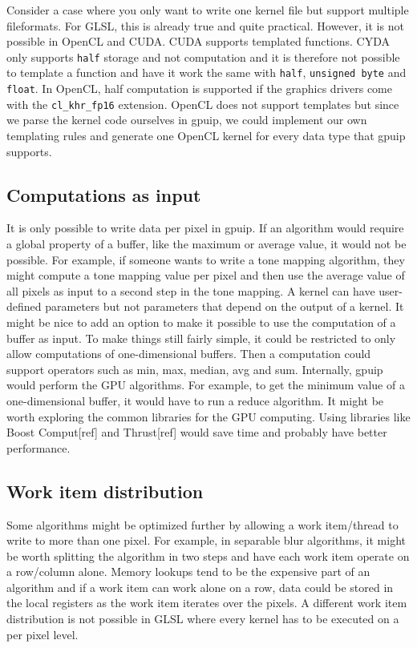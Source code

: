 Consider a case where you only want to write one kernel file but support multiple fileformats. For GLSL, this is already true and quite practical. However, it is not possible in OpenCL and CUDA. CUDA supports templated functions. CYDA only supports {\tt half} storage and not computation and it is therefore not possible to template a function and have it work the same with {\tt half}, {\tt unsigned byte} and {\tt float}. In OpenCL, half computation is supported if the graphics drivers come with the {\tt cl\_khr\_fp16} extension. OpenCL does not support templates but since we parse the kernel code ourselves in gpuip, we could implement our own templating rules and generate one OpenCL kernel for every data type that gpuip supports. 

\subsection{Computations as input}

It is only possible to write data per pixel in gpuip. If an algorithm would require a global property of a buffer, like the maximum or average value, it would not be possible. For example, if someone wants to write a tone mapping algorithm, they might compute a tone mapping value per pixel and then use the average value of all pixels as input to a second step in the tone mapping. A kernel can have user-defined parameters but not parameters that depend on the output of a kernel. It might be nice to add an option to make it possible to use the computation of a buffer as input. To make things still fairly simple, it could be restricted to only allow computations of one-dimensional buffers. Then a computation could support operators such as min, max, median, avg and sum. Internally, gpuip would perform the GPU algorithms. For example, to get the minimum value of a one-dimensional buffer, it would have to run a reduce algorithm. It might be worth exploring the common libraries for the GPU computing. Using libraries like Boost Comput[ref] and Thrust[ref] would save time and probably have better performance.

\subsection{Work item distribution}

Some algorithms might be optimized further by allowing a work item/thread to write to more than one pixel. For example, in separable blur algorithms, it might be worth splitting the algorithm in two steps and have each work item operate on a row/column alone. Memory lookups tend to be the expensive part of an algorithm and if a work item can work alone on a row, data could be stored in the local registers as the work item iterates over the pixels. A different work item distribution is not possible in GLSL where every kernel has to be executed on a per pixel level.
